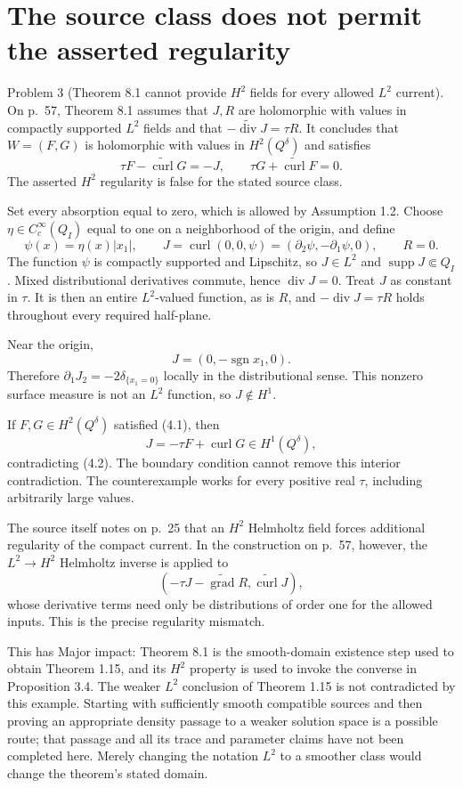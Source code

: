 \documentclass[10pt]{article}
\begin{document}
\section*{The source class does not permit the asserted regularity}
Problem 3 (Theorem 8.1 cannot provide \(H^2\) fields for every allowed \(L^2\) current).  On p. 57, Theorem 8.1 assumes that \(J,R\) are holomorphic with values in compactly supported \(L^2\) fields and that \(-\widetilde{\operatorname{div}}J=\tau R\). It concludes that \(W=(F,G)\) is holomorphic with values in \(H^2(Q^\delta)\) and satisfies \[\tau F-\widetilde{\operatorname{curl}}G=-J,\qquad \tau G+\widetilde{\operatorname{curl}}F=0 .
 \tag{4.1}\] The asserted \(H^2\) regularity is false for the stated source class.\par
Set every absorption equal to zero, which is allowed by Assumption 1.2. Choose \(\eta\in C^\infty_c(Q_I)\) equal to one on a neighborhood of the origin, and define \[\psi(x)=\eta(x)|x_1|,\qquad
 J=\operatorname{curl}(0,0,\psi)
       =(\partial_2\psi,-\partial_1\psi,0),\qquad R=0.
 \tag{4.2}\] The function \(\psi\) is compactly supported and Lipschitz, so \(J\in L^2\) and \(\operatorname{supp}J\Subset Q_I\). Mixed distributional derivatives commute, hence \(\operatorname{div}J=0\). Treat \(J\) as constant in \(\tau\). It is then an entire \(L^2\)-valued function, as is \(R\), and \(-\operatorname{div}J=\tau R\) holds throughout every required half-plane.\par
Near the origin, \[J=(0,-\operatorname{sgn}x_1,0).\] Therefore \(\partial_1J_2=-2\delta_{\{x_1=0\}}\) locally in the distributional sense. This nonzero surface measure is not an \(L^2\) function, so \(J\notin H^1\).\par
If \(F,G\in H^2(Q^\delta)\) satisfied (4.1), then \[J=-\tau F+\operatorname{curl}G\in H^1(Q^\delta),\] contradicting (4.2). The boundary condition cannot remove this interior contradiction. The counterexample works for every positive real \(\tau\), including arbitrarily large values.\par
The source itself notes on p. 25 that an \(H^2\) Helmholtz field forces additional regularity of the compact current. In the construction on p. 57, however, the \(L^2\to H^2\) Helmholtz inverse is applied to \[(-\tau J-\widetilde{\operatorname{grad}}R,\widetilde{\operatorname{curl}}J),\] whose derivative terms need only be distributions of order one for the allowed inputs. This is the precise regularity mismatch.\par
This has Major impact: Theorem 8.1 is the smooth-domain existence step used to obtain Theorem 1.15, and its \(H^2\) property is used to invoke the converse in Proposition 3.4. The weaker \(L^2\) conclusion of Theorem 1.15 is not contradicted by this example. Starting with sufficiently smooth compatible sources and then proving an appropriate density passage to a weaker solution space is a possible route; that passage and all its trace and parameter claims have not been completed here. Merely changing the notation \(L^2\) to a smoother class would change the theorem’s stated domain.\par
\end{document}
